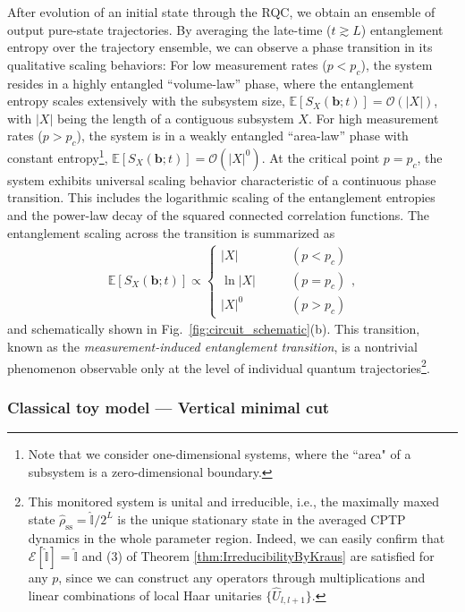 \documentclass[preprint,pteplogo]{ptephy_v2}%
\numberwithin{equation}{section}
\theoremstyle{definition}
\begin{document}
After evolution of an initial state through the RQC, we obtain an ensemble of output pure-state trajectories.
By averaging the late-time ($t\gtrsim L$) entanglement entropy over the trajectory ensemble, we can observe a phase transition in its qualitative scaling behaviors:
For low measurement rates ($p < p_c$), the system resides in a highly entangled ``volume-law'' phase, where the entanglement entropy scales extensively with the subsystem size, $\mathbb{E}[S_X(\bm{b};\!t)]=\mathcal{O}(|X|)$, with $|X|$ being the length of a contiguous subsystem $X$.
For high measurement rates ($p > p_c$), the system is in a weakly entangled ``area-law'' phase with constant entropy\footnote{
Note that we consider one-dimensional systems, where the ``area" of a subsystem is a zero-dimensional boundary.
}, $\mathbb{E}[S_X(\bm{b};\!t)]=\mathcal{O}(|X|^0)$.
At the critical point $p = p_c$, the system exhibits universal scaling behavior characteristic of a continuous phase transition.
This includes the logarithmic scaling of the entanglement entropies and the power-law decay of the squared connected correlation functions.
The entanglement scaling across the transition is summarized as
\begin{align}
    \mathbb{E}[S_X(\bm{b};\!t)] \propto
    \left\{
    \begin{array}{ll}
    |X| \qquad & (p < p_c) \\
    \ln |X| \qquad & (p = p_c) \\
    |X|^0 \qquad & (p > p_c)
    \end{array}
\right.,
\end{align}
and schematically shown in Fig.~\ref{fig:circuit_schematic}(b).
This transition, known as the \emph{measurement-induced entanglement transition}, is a nontrivial phenomenon observable only at the level of individual quantum trajectories\footnote{
This monitored system is unital and irreducible, i.e., the maximally maxed state $\hat{\rho}_\mathrm{ss}=\hat{\mathbb{I}}/2^L$ is the unique stationary state in the averaged CPTP dynamics in the whole parameter region. 
Indeed, we can easily confirm that $\mathcal{E}[\hat{\mathbb{I}}]=\hat{\mathbb{I}}$ and (3) of Theorem \ref{thm:IrreducibilityByKraus} are satisfied for any $p$, since we can construct any operators through multiplications and linear combinations of local Haar unitaries $\{\hat{U}_{l,l+1}\}$.
}.

\subsubsection{Classical toy model --- Vertical minimal cut}
\label{sec:VerticalMinimalCut}
\end{document}
